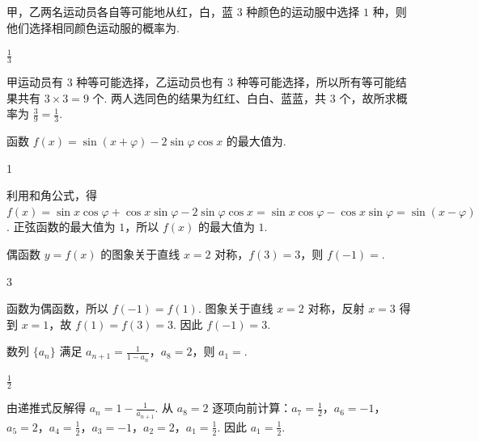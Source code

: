 \begin{problem}
甲，乙两名运动员各自等可能地从红，白，蓝 \(3\) 种颜色的运动服中选择 \(1\) 种，则他们选择相同颜色运动服的概率为\fillinblank{}.
\end{problem}

\begin{answer}
\(\frac{1}{3}\)
\end{answer}

\begin{solution}
甲运动员有 \(3\) 种等可能选择，乙运动员也有 \(3\) 种等可能选择，所以所有等可能结果共有 \(3\times3=9\) 个. 两人选同色的结果为红红、白白、蓝蓝，共 \(3\) 个，故所求概率为 \(\frac{3}{9}=\frac13\).
\end{solution}

\begin{problem}
函数 \(f(x)=\sin\left(x+\varphi\right)-2\sin\varphi\cos x\) 的最大值为\fillinblank{}.
\end{problem}

\begin{answer}
1
\end{answer}

\begin{solution}
利用和角公式，得 \(f(x)=\sin x\cos\varphi+\cos x\sin\varphi-2\sin\varphi\cos x=\sin x\cos\varphi-\cos x\sin\varphi=\sin(x-\varphi)\). 正弦函数的最大值为 \(1\)，所以 \(f(x)\) 的最大值为 \(1\).
\end{solution}

\begin{problem}
偶函数 \(y=f(x)\) 的图象关于直线 \(x=2\) 对称，\(f(3)=3\)，则 \(f(-1)=\)\fillinblank{}.
\end{problem}

\begin{answer}
3
\end{answer}

\begin{solution}
函数为偶函数，所以 \(f(-1)=f(1)\). 图象关于直线 \(x=2\) 对称，反射 \(x=3\) 得到 \(x=1\)，故 \(f(1)=f(3)=3\). 因此 \(f(-1)=3\).
\end{solution}

\begin{problem}
数列 \(\{a_n\}\) 满足 \(a_{n+1}=\frac{1}{1-a_n}\)，\(a_8=2\)，则 \(a_1=\)\fillinblank{}.
\end{problem}

\begin{answer}
\(\frac{1}{2}\)
\end{answer}

\begin{solution}
由递推式反解得 \(a_n=1-\frac{1}{a_{n+1}}\). 从 \(a_8=2\) 逐项向前计算：\(a_7=\frac12\)，\(a_6=-1\)，\(a_5=2\)，\(a_4=\frac12\)，\(a_3=-1\)，\(a_2=2\)，\(a_1=\frac12\). 因此 \(a_1=\frac12\).
\end{solution}

